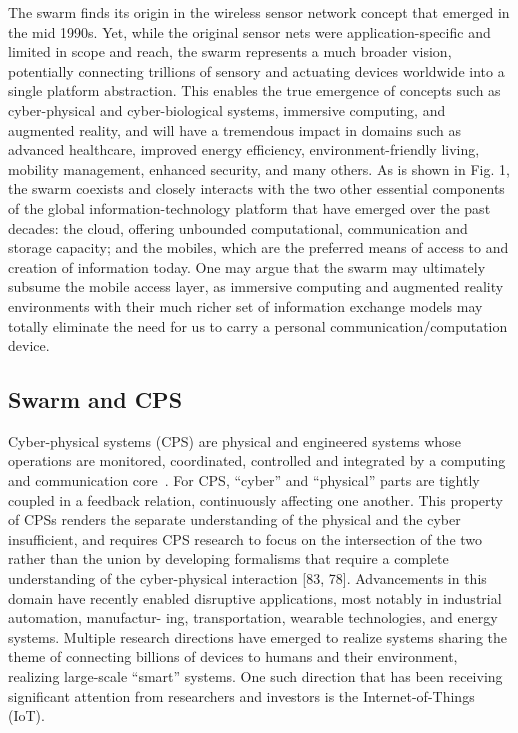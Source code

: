 The swarm finds its origin in the wireless sensor network concept that emerged
in the mid 1990s. Yet, while the original sensor nets were application-specific
and limited in scope and reach, the swarm represents a much broader vision,
potentially connecting trillions of sensory and actuating devices worldwide into
a single platform abstraction. This enables the true emergence of concepts such
as cyber-physical and cyber-biological systems, immersive computing, and
augmented reality, and will have a tremendous impact in domains such as advanced
healthcare, improved energy efficiency, environment-friendly living, mobility
management, enhanced security, and many others. As is shown in Fig. 1, the swarm
coexists and closely interacts with the two other essential components of the
global information-technology platform that have emerged over the past decades:
the cloud, offering unbounded computational, communication and storage capacity;
and the mobiles, which are the preferred means of access to and creation of
information today. One may argue that the swarm may ultimately subsume the
mobile access layer, as immersive computing and augmented reality environments
with their much richer set of information exchange models may totally eliminate
the need for us to carry a personal communication/computation device.

\subsection{Swarm and CPS}
\label{sec:swarm-cps}

Cyber-physical systems (CPS) are physical and engineered systems whose
operations are monitored, coordinated, controlled and integrated by a computing
and communication core~\cite{rajkumar2010cyber}. For CPS, ``cyber'' and
``physical'' parts are tightly coupled in a feedback relation, continuously
affecting one another. This property of CPSs renders the separate understanding
of the physical and the cyber insufficient, and requires CPS research to focus
on the intersection of the two rather than the union by developing formalisms
that require a complete understanding of the cyber-physical interaction [83,
78]. Advancements in this domain have recently enabled disruptive applications,
most notably in industrial automation, manufactur- ing, transportation, wearable
technologies, and energy systems. Multiple research directions have emerged to
realize systems sharing the theme of connecting billions of devices to humans
and their environment, realizing large-scale ``smart'' systems. One such
direction that has been receiving significant attention from researchers and
investors is the Internet-of-Things (IoT).

